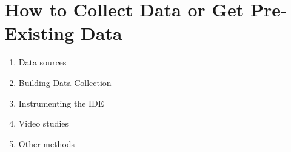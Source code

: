 \section{How to Collect Data or Get Pre-Existing Data}


  \begin{enumerate}
  \item Data sources
  \item Building Data Collection %
  \item Instrumenting the IDE %
  \item Video studies %
  \item Other methods
  \end{enumerate}